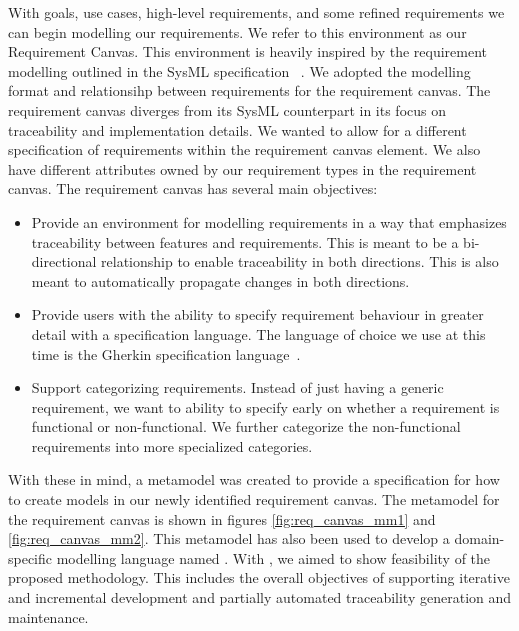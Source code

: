 With goals, use cases, high-level requirements, and some refined requirements we can begin modelling our requirements. We refer to this environment as our Requirement Canvas. This environment is heavily inspired by the requirement modelling outlined in the SysML specification ~\cite{sysml2019omg}. We adopted the modelling format and relationsihp between requirements for the requirement canvas. The requirement canvas diverges from its SysML counterpart in its focus on traceability and implementation details. We wanted to allow for a different specification of requirements within the requirement canvas element. We also have different attributes owned by our requirement types in the requirement canvas. The requirement canvas has several main objectives:
\begin{itemize}
	\item Provide an environment for modelling requirements in a way that emphasizes traceability between features and requirements. This is meant to be a bi-directional relationship to enable traceability in both directions. This is also meant to automatically propagate changes in both directions.
	\item Provide users with the ability to specify requirement behaviour in greater detail with a specification language. The language of choice we use at this time is the Gherkin specification language~\cite{cucumberdocs}.
	\item Support categorizing requirements. Instead of just having a generic requirement, we want to ability to specify early on whether a requirement is functional or non-functional. We further categorize the non-functional requirements into more specialized categories.
\end{itemize}  

With these in mind, a metamodel was created to provide a specification for how to create models in our newly identified requirement canvas. The metamodel for the requirement canvas is shown in figures \ref{fig:req_canvas_mm1} and \ref{fig:req_canvas_mm2}. This metamodel has also been used to develop a domain-specific modelling language named \tool. With \tool, we aimed to show feasibility of the proposed methodology. This includes the overall objectives of supporting iterative and incremental development and partially automated traceability generation and maintenance.

